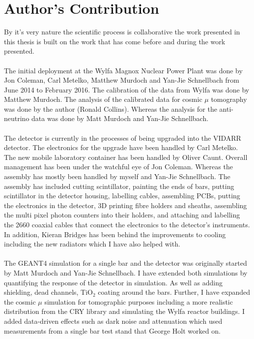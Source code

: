 \chapter{Author's Contribution}

By it's very nature the scientific process is collaborative the work presented in this thesis is built on the work that has come before and during the work presented. 
\\\\The initial deployment at the Wylfa Magnox Nuclear Power Plant was done by Jon Coleman, Carl Metelko, Matthew Murdoch and Yan-Jie Schnellbach from June 2014 to February 2016. The calibration of the data from Wylfa was done by Matthew Murdoch. The analysis of the calibrated data for cosmic $\mu$ tomography was done by the author (Ronald Collins). Whereas the analysis for the anti-neutrino data was done by Matt Murdoch and Yan-Jie Schnellbach. 
\\\\The detector is currently in the processes of being upgraded into the VIDARR detector. The electronics for the upgrade have been handled by Carl Metelko. The new mobile laboratory container has been handled by Oliver Caunt. Overall management has been under the watchful eye of Jon Coleman. Whereas the assembly has mostly been handled by myself and Yan-Jie Schnellbach. The assembly has included cutting scintillator, painting the ends of bars, putting scintillator in the detector housing, labelling cables, assembling PCBs, putting the electronics in the detector, 3D printing fibre holders and sheaths, assembling the multi pixel photon counters into their holders, and attaching and labelling the 2660 coaxial cables that connect the electronics to the detector's instruments. In addition, Kieran Bridges has been behind the improvements to cooling including the new radiators which I have also helped with. 
\\\\The GEANT4 simulation for a single bar and the detector was originally started by Matt Murdoch and Yan-Jie Schnellbach. I have extended both simulations by quantifying the response of the detector in simulation. As well as adding shielding, dead channels, TiO$_2$ coating around the bars. Further, I have expanded the cosmic $\mu$  simulation for tomographic purposes including a more realistic distribution from the CRY library and simulating the Wylfa reactor buildings. I added data-driven effects such as dark noise and attenuation which used measurements from a single bar test stand that George Holt worked on. 

